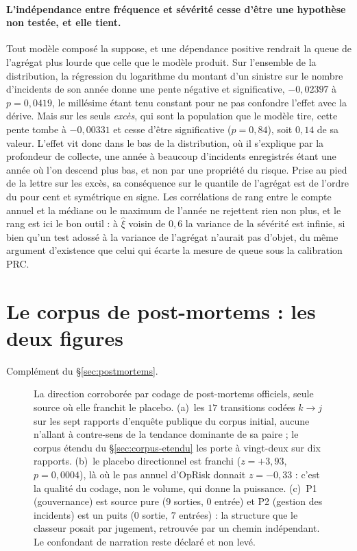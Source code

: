 \paragraph{L'indépendance entre fréquence et sévérité cesse d'être une hypothèse non testée, et
elle tient.} Tout modèle composé la suppose, et une dépendance positive rendrait la queue de
l'agrégat plus lourde que celle que le modèle produit. Sur l'ensemble de la distribution, la
régression du logarithme du montant d'un sinistre sur le nombre d'incidents de son année donne
une pente négative et significative, $-0{,}02397$ à $p = 0{,}0419$, le millésime étant tenu
constant pour ne pas confondre l'effet avec la dérive. Mais sur les seuls \emph{excès}, qui sont
la population que le modèle tire, cette pente tombe à $-0{,}00331$ et cesse d'être significative
($p = 0{,}84$), soit $0{,}14$ de sa valeur. L'effet vit donc dans le bas de la distribution, où il
s'explique par la profondeur de collecte, une année à beaucoup d'incidents enregistrés étant une
année où l'on descend plus bas, et non par une propriété du risque. Prise au pied de la lettre
sur les excès, sa conséquence sur le quantile de l'agrégat est de l'ordre du pour cent et
symétrique en signe. Les corrélations de rang entre le compte annuel et la médiane ou le maximum
de l'année ne rejettent rien non plus, et le rang est ici le bon outil : à $\hat\xi$ voisin de
$0{,}6$ la variance de la sévérité est infinie, si bien qu'un test adossé à la variance de
l'agrégat n'aurait pas d'objet, du même argument d'existence que celui qui écarte la mesure de
queue sous la calibration PRC.

\section{Le corpus de post-mortems : les deux figures}
\label{sec:ann-corpus}


Complément du \S\ref{sec:postmortems}.

\begin{figure}[htbp]
  \centering
  \caption{La direction corroborée par codage de post-mortems
officiels, seule source où elle franchit le placebo. (a)~les $17$ transitions codées
$k\to j$ sur les sept rapports d'enquête publique du corpus initial, aucune n'allant à contre-sens
de la tendance dominante de sa paire ; le corpus étendu du \S\ref{sec:corpus-etendu} les porte à
vingt-deux sur dix rapports. (b)~le placebo directionnel est franchi ($z=+3{,}93$,
$p=0{,}0004$), là où le pas annuel d'OpRisk donnait $z=-0{,}33$ : c'est la qualité du codage,
non le volume, qui donne la puissance. (c)~P1 (gouvernance) est source pure ($9$
sorties, $0$ entrée) et P2 (gestion des incidents) est un puits ($0$ sortie, $7$ entrées) : la
structure que le classeur posait par jugement, retrouvée par un chemin indépendant. Le
confondant de narration reste déclaré et non levé.}
  \label{fig:postmortem}
\end{figure}


